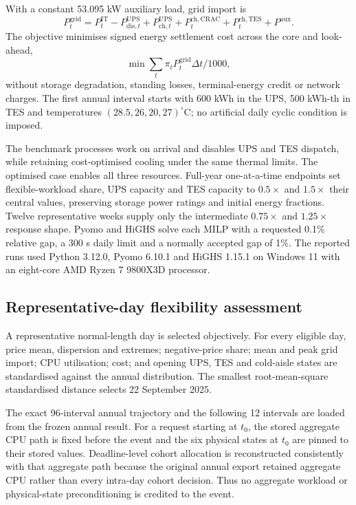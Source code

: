 With a constant 53.095 kW auxiliary load, grid import is
\begin{equation}
 P^{\mathrm{grid}}_t=P^{\mathrm{IT}}_t-P^{\mathrm{UPS}}_{\mathrm{dis},t}
 +P^{\mathrm{UPS}}_{\mathrm{ch},t}+P^{\mathrm{ch,CRAC}}_t
 +P^{\mathrm{ch,TES}}_t+P^{\mathrm{aux}}. \label{eq:grid}
\end{equation}
The objective minimises signed energy settlement cost across the core and
look-ahead,
\begin{equation}
 \min \sum_t \pi_tP^{\mathrm{grid}}_t\Delta t/1000, \label{eq:objective}
\end{equation}
without storage degradation, standing losses, terminal-energy credit or
network charges. The first annual interval starts with 600 kWh in the UPS,
500 kWh-th in TES and temperatures $(28.5,26,20,27)^{\circ}$C; no artificial
daily cyclic condition is imposed.

The benchmark processes work on arrival and disables UPS and TES dispatch,
while retaining cost-optimised cooling under the same thermal limits. The
optimised case enables all three resources. Full-year one-at-a-time endpoints
set flexible-workload share, UPS capacity and TES capacity to $0.5\times$ and
$1.5\times$ their central values, preserving storage power ratings and initial
energy fractions. Twelve representative weeks supply only the intermediate
$0.75\times$ and $1.25\times$ response shape. Pyomo and HiGHS solve each MILP
with a requested 0.1\% relative gap, a 300 s daily limit and a normally accepted
gap of 1\%.
The reported runs used Python 3.12.0, Pyomo 6.10.1 and HiGHS 1.15.1 on
Windows 11 with an eight-core AMD Ryzen 7 9800X3D processor.

\subsection{Representative-day flexibility assessment}\label{sec:scenario 3}

A representative normal-length day is selected objectively. For every eligible
day, price mean, dispersion and extremes; negative-price share; mean and peak
grid import; CPU utilisation; cost; and opening UPS, TES and cold-aisle states
are standardised against the annual distribution. The smallest root-mean-square
standardised distance selects 22 September 2025.

The exact 96-interval annual trajectory and the following 12 intervals are
loaded from the frozen annual result. For a request starting at $t_0$, the
stored aggregate CPU path is fixed before the event and the six physical states
at $t_0$ are pinned to their stored values. Deadline-level cohort allocation is
reconstructed consistently with that aggregate path because the original
annual export retained aggregate CPU rather than every intra-day cohort
decision. Thus no aggregate workload or physical-state preconditioning is
credited to the event.

